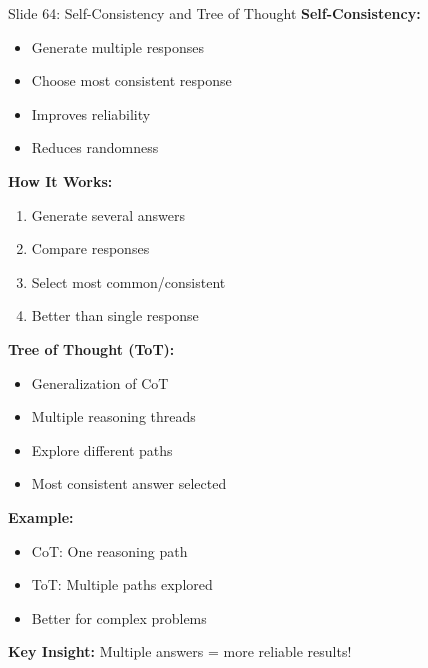 \documentclass[8pt]{beamer}
\begin{document}
	\begin{frame}{Slide 64: Self-Consistency and Tree of Thought}
		\fontsize{6.5}{7.5}\selectfont
		\textbf{Self-Consistency:}
		\begin{itemize}
			\item Generate multiple responses
			\item Choose most consistent response
			\item Improves reliability
			\item Reduces randomness
		\end{itemize}
		
		\vspace{0.1cm}
		\textbf{How It Works:}
		\begin{enumerate}
			\item Generate several answers
			\item Compare responses
			\item Select most common/consistent
			\item Better than single response
		\end{enumerate}
		
		\vspace{0.1cm}
		\textbf{Tree of Thought (ToT):}
		\begin{itemize}
			\item Generalization of CoT
			\item Multiple reasoning threads
			\item Explore different paths
			\item Most consistent answer selected
		\end{itemize}
		
		\vspace{0.1cm}
		\textbf{Example:}
		\begin{itemize}
			\item CoT: One reasoning path
			\item ToT: Multiple paths explored
			\item Better for complex problems
		\end{itemize}
		
		\textcolor{myblue}{\textbf{Key Insight:}} Multiple answers = more reliable results!
	\end{frame}
	
\end{document}
